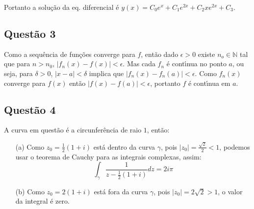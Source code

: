 Portanto a solu\c c\~ao da eq. diferencial \'e $y(x)=C_0e^x+C_1e^{2x}+ C_2 xe^{2x}+C_3$.

\subsection{\color{red} Quest\~ao 3}

Como a sequ\^encia de fun\c c\~oes converge para $f$, ent\~ao dado $\epsilon>0$ existe $n_o \in \mathbb N$ tal que para $n>n_0$, $|f_n(x)-f(x)|<\epsilon$.  Mas cada $f_n$ \'e cont\'\i nua no ponto $a$, ou seja, para $\delta>0$, $|x-a|<\delta$ implica que $|f_n(x)-f_n(a)|<\epsilon$. Como $f_n(x)$ converge para $f(x)$ ent\~ao $|f(x)-f(a)|<\epsilon$, portanto $f$ \'e cont\'\i nua em $a$.

\subsection{\color{red} Quest\~ao 4}

A curva em quest\~ao \'e a circunfer\^encia de raio $1$, ent\~ao:

\begin{enumerate}

\item[(a)] Como $z_0=\frac1{2}(1+i)$ est\'a dentro da curva $\gamma$, pois $|z_0|=\frac{\sqrt 2}{2}<1$, podemos usar o teorema de Cauchy para as integrais complexas, assim: $$\displaystyle \int_\gamma \frac1{z-\frac1{2}(1+i)} dz=2i\pi$$

\item[(b)] Como $z_0=2(1+i)$ est\'a fora da curva $\gamma$, pois $|z_0|=2\sqrt 2 > 1$, o valor da integral \'e zero.

\end{enumerate}

